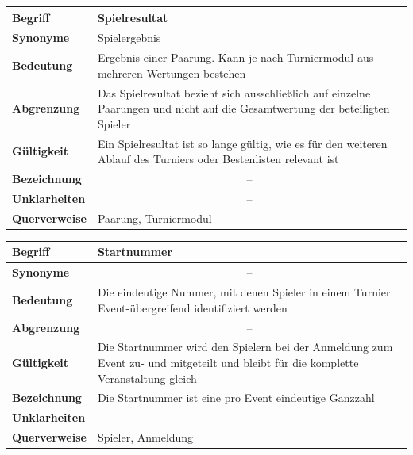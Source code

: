 \documentclass[11pt]{article}
\begin{document}
\begin{tabularx}{\textwidth}{| p{} | p{} |}
	\hline
	\textbf{Begriff} & Spielresultat\\
	\hline
	\textbf{Synonyme} & Spielergebnis \\
	\hline
	\textbf{Bedeutung} & Ergebnis einer Paarung. Kann je nach Turniermodul aus mehreren Wertungen bestehen\\
	\hline
	\textbf{Abgrenzung} & Das Spielresultat bezieht sich ausschließlich auf einzelne Paarungen und nicht auf die Gesamtwertung der beteiligten Spieler\\
	\hline
	\textbf{Gültigkeit} & Ein Spielresultat ist so lange gültig, wie es für den weiteren Ablauf des Turniers oder Bestenlisten relevant ist \\
	\hline
	\textbf{Bezeichnung} & \multicolumn{1}{c|}{--} \\
	\hline
	\textbf{Unklarheiten} & \multicolumn{1}{c|}{--} \\
	\hline
	\textbf{Querverweise} & Paarung, Turniermodul\\
	\hline
\end{tabularx}

\begin{tabularx}{\textwidth}{| p{} | p{} |}
	\hline
	\textbf{Begriff} & Startnummer\\
	\hline
	\textbf{Synonyme} & \multicolumn{1}{c|}{--} \\
	\hline
	\textbf{Bedeutung} & Die eindeutige Nummer, mit denen Spieler in einem Turnier Event-übergreifend identifiziert werden\\
	\hline
	\textbf{Abgrenzung} & \multicolumn{1}{c|}{--} \\
	\hline
	\textbf{Gültigkeit} & Die Startnummer wird den Spielern bei der Anmeldung zum Event zu- und mitgeteilt und bleibt für die komplette Veranstaltung gleich\\
	\hline
	\textbf{Bezeichnung} & Die Startnummer ist eine pro Event eindeutige Ganzzahl\\
	\hline
	\textbf{Unklarheiten} & \multicolumn{1}{c|}{--} \\
	\hline
	\textbf{Querverweise} & Spieler, Anmeldung \\
	\hline
\end{tabularx}
\end{document}
